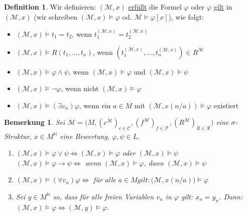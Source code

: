 \documentclass{article}
\newtheorem*{bem}{Bemerkung}
\theoremstyle{definition}
\newtheorem{dfn}{Definition}
\newcommand{\calC}{\mathcal{C}}
\newcommand{\calF}{\mathcal{F}}
\newcommand{\calM}{\mathcal{M}}
\newcommand{\calR}{\mathcal{R}}
\newcommand{\struc}[3]{\big(#1, (c^{#2})_{c \in \calC_{#3}}, (f^{#2})_{f \in \calF_{#3}}, (R^{#2})_{R \in \calR_{#3}}\big)}
\begin{document}
    \begin{dfn}
        Wir definieren: $ (\calM, x) $ \underline{erfüllt} die Formel $ \varphi $ oder $ \varphi $ \underline{gilt} in $ (\calM, x) $ (wir schreiben $ (\calM, x) \models \varphi $ od. $ \calM \models \varphi[x] $), wie folgt:
        \begin{itemize}
            \item $ (\calM, x) \models t_1 = t_2 $, wenn $ t^{(\calM, x)}_1 = t^{(\calM, x)}_2 $
            \item $ (\calM, x) \models R(t_1, ..., t_n) $, wenn $ (t_1^{(\calM, x)}, ..., t_n^{(\calM, x)}) \in R^\calM $
            \item $ (\calM, x) \models \varphi \land \psi $, wenn $ (\calM, x) \models \varphi $ und $ (\calM, x) \models \psi $
            \item $ (\calM, x) \models \neg \varphi $, wenn nicht $ (\calM, x) \models \varphi $
            \item $ (\calM, x) \models (\exists v_n) \varphi $, wenn ein $ a \in M $ mit $ (\calM, x(n/a)) \models \varphi $ existiert
        \end{itemize}
    \end{dfn}

    \begin{bem}
        Sei $ \calM = \struc{M}{\calM}{} $ eine $ \sigma $-Struktur, $ x \in M^{\mathbb{N}} $ eine Bewertung, $\varphi, \psi \in L $.
        \begin{enumerate}
            \item $ (\calM, x) \models \varphi \lor \psi \Leftrightarrow (\calM, x) \models \varphi $ oder $ (\calM, x) \models \psi $\\
            $ (\calM, x) \models \varphi \rightarrow \psi \Leftrightarrow $ wenn $ (\calM, x) \models \varphi $, dann $ ( \calM, x) \models \psi $
            \item $ (\calM, x) \models (\forall v_n) \varphi \Leftrightarrow $ für alle $ a \in M gilt: \big(\calM, x(n/a)\big) \models \varphi $
            \item Sei $ y \in M^{\mathbb{N}} $ so, dass für alle freien Variablen $ v_n $ in $ \varphi $ gilt: $ x_n = y_n $.
            Dann: $ (\calM, x) \models \varphi \Leftrightarrow (\calM, y ) \models \varphi $. \label{itm:freie-variablen-gleich}
        \end{enumerate}
    \end{bem}
\end{document}

